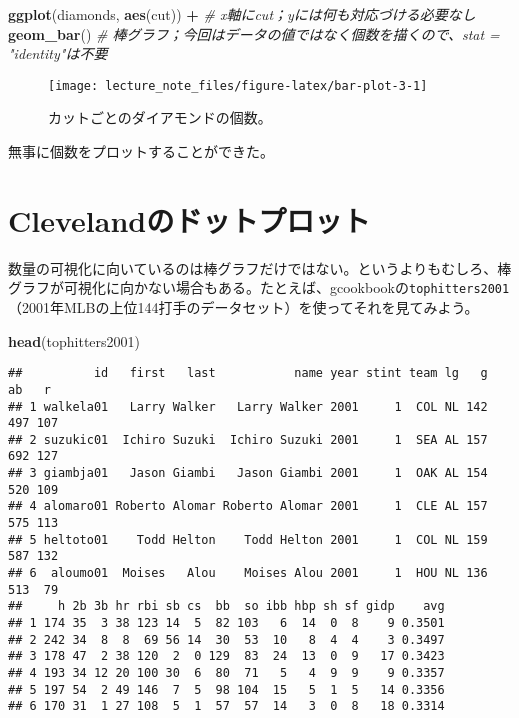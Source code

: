 \documentclass[]{book}
\newenvironment{Shaded}{\begin{snugshade}}{\end{snugshade}}
\newcommand{\KeywordTok}[1]{\textcolor[rgb]{0.13,0.29,0.53}{\textbf{#1}}}
\newcommand{\StringTok}[1]{\textcolor[rgb]{0.31,0.60,0.02}{#1}}
\newcommand{\CommentTok}[1]{\textcolor[rgb]{0.56,0.35,0.01}{\textit{#1}}}
\newcommand{\OperatorTok}[1]{\textcolor[rgb]{0.81,0.36,0.00}{\textbf{#1}}}
\newcommand{\NormalTok}[1]{#1}
\begin{document}
\begin{Shaded}
\begin{Highlighting}[]
\KeywordTok{ggplot}\NormalTok{(diamonds, }\KeywordTok{aes}\NormalTok{(cut)) }\OperatorTok{+}\StringTok{ }\CommentTok{# x軸にcut；yには何も対応づける必要なし}
\StringTok{  }\KeywordTok{geom_bar}\NormalTok{() }\CommentTok{# 棒グラフ；今回はデータの値ではなく個数を描くので、stat = "identity"は不要}
\end{Highlighting}
\end{Shaded}

\begin{figure}

{\centering \texttt{[image: lecture\_note\_files/figure-latex/bar-plot-3-1]} 

}

\caption{カットごとのダイアモンドの個数。}\label{fig:bar-plot-3}
\end{figure}

無事に個数をプロットすることができた。

\section{Clevelandのドットプロット}\label{cleveland}

数量の可視化に向いているのは棒グラフだけではない。というよりもむしろ、棒グラフが可視化に向かない場合もある。たとえば、gcookbookの\texttt{tophitters2001}（2001年MLBの上位144打手のデータセット）を使ってそれを見てみよう。

\begin{Shaded}
\begin{Highlighting}[]
\KeywordTok{head}\NormalTok{(tophitters2001)}
\end{Highlighting}
\end{Shaded}

\begin{verbatim}
##          id   first   last           name year stint team lg   g  ab   r
## 1 walkela01   Larry Walker   Larry Walker 2001     1  COL NL 142 497 107
## 2 suzukic01  Ichiro Suzuki  Ichiro Suzuki 2001     1  SEA AL 157 692 127
## 3 giambja01   Jason Giambi   Jason Giambi 2001     1  OAK AL 154 520 109
## 4 alomaro01 Roberto Alomar Roberto Alomar 2001     1  CLE AL 157 575 113
## 5 heltoto01    Todd Helton    Todd Helton 2001     1  COL NL 159 587 132
## 6  aloumo01  Moises   Alou    Moises Alou 2001     1  HOU NL 136 513  79
##     h 2b 3b hr rbi sb cs  bb  so ibb hbp sh sf gidp    avg
## 1 174 35  3 38 123 14  5  82 103   6  14  0  8    9 0.3501
## 2 242 34  8  8  69 56 14  30  53  10   8  4  4    3 0.3497
## 3 178 47  2 38 120  2  0 129  83  24  13  0  9   17 0.3423
## 4 193 34 12 20 100 30  6  80  71   5   4  9  9    9 0.3357
## 5 197 54  2 49 146  7  5  98 104  15   5  1  5   14 0.3356
## 6 170 31  1 27 108  5  1  57  57  14   3  0  8   18 0.3314
\end{verbatim}
\end{document}

